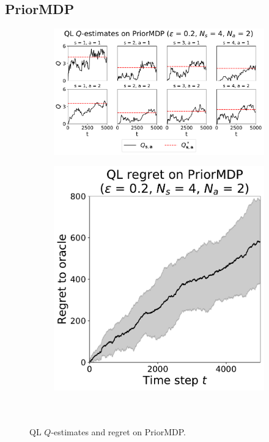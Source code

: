 \documentclass{article}
\begin{document}
\begin{appendices}

\clearpage

\subsection{PriorMDP}

\begin{figure}[h!]
\centering
\begin{subfigure}{0.65\textwidth}
\includegraphics[width=\linewidth]{img/ql-0_2-qestimates-priormdp-4-2.pdf}
\end{subfigure}
\begin{subfigure}{0.34\textwidth}
\includegraphics[width=\linewidth]{img/ql-0_2-regret-priormdp-4-2.pdf}~\\~\\
\end{subfigure}
\captionsetup{width=0.9\linewidth}
\caption{QL $Q$-estimates and regret on PriorMDP.}\label{ql_priormdp_visual}
\end{figure}



\end{appendices}
\end{document}
